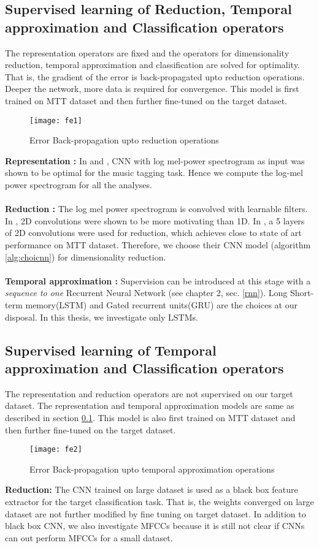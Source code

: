 \subsection{Supervised learning of Reduction, Temporal approximation and Classification operators}
\label{fe1}
The representation operators are fixed and the operators for dimensionality reduction, temporal approximation and classification are solved for optimality. That is, the gradient of the error is back-propagated upto reduction operations. Deeper the network, more data is required for convergence. This model is first trained on MTT dataset and then further fine-tuned on the target dataset.
\begin{figure}[h] 
\centering
\texttt{[image: fe1]}
\caption{Error Back-propagation upto reduction operations }
 \label{fig:fe1}
 \end{figure}
\FloatBarrier

\noindent \textbf{Representation :} In \cite{choi_cnn} and \cite{EndToEnd}, CNN with log mel-power spectrogram as input was shown to be optimal for the music tagging task. Hence we compute the log-mel power spectrogram for all the analyses.\\
\\  
\textbf{Reduction :} The log mel power spectrogram is convolved with learnable filters. In \cite{MusicMotive}, 2D convolutions were shown to be more motivating than 1D. In \cite{choi_cnn}, a 5 layers of 2D convolutions were used for reduction, which achieves close to state of art performance on MTT dataset. Therefore, we choose their CNN model (algorithm \ref{alg:choicnn}) for dimensionality reduction.\\
\\  
\textbf{Temporal approximation :} Supervision can be introduced at this stage with a \textit{sequence to one} Recurrent Neural Network (see chapter 2, sec. \ref{rnn}). Long Short-term memory(LSTM) and Gated recurrent units(GRU) are the choices at our disposal. In this thesis, we investigate only LSTMs. 
        
\subsection{Supervised learning of Temporal approximation and Classification operators}
\label{fe2}
The representation and reduction operators are not supervised on our target dataset. The representation and temporal approximation models are same as described in section \ref{fe1}. This model is also first trained on MTT dataset and then further fine-tuned on the target dataset. 
\begin{figure}[h] 
\centering
\texttt{[image: fe2]}
\caption{Error Back-propagation upto temporal approximation operations }
 \label{fig:fe2}
 \end{figure}
\FloatBarrier
\noindent \textbf{Reduction:} The CNN trained on large dataset is used as a black box feature extractor for the target classification task. That is, the weights converged on large dataset are not further modified by fine tuning on target dataset. In addition to black box CNN, we also investigate MFCCs because it is still not clear if CNNs can out perform MFCCs for a small dataset.

